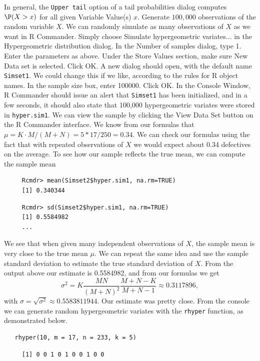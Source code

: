 \documentclass[captions=tableheading]{scrbook}
\begin{document}
\begin{example}
   In general, the \texttt{Upper tail} option of a tail probabilities dialog computes \(\P(X>x)\) for all given \textsf{Variable Value(s)} \(x\).
Generate \(100,000\) observations of the random variable \(X\).
   We can randomly simulate as many observations of \(X\) as we want in \textsf{R} Commander. Simply choose \textsf{Simulate hypergeometric variates}... in the \textsf{Hypergeometric distribution} dialog. 
   In the \textsf{Number of samples} dialog, type 1. Enter the parameters as above. Under the \textsf{Store Values} section, make sure \textsf{New Data set} is selected. Click \textsf{OK}. 
   A new dialog should open, with the default name \texttt{Simset1}.  We could change this if we like, according to the rules for \textsf{R} object names. In the sample size box, enter 100000. Click \textsf{OK}. 
   In the Console Window, \textsf{R} Commander should issue an alert that \texttt{Simset1} has been initialized, and in a few seconds, it should also state that 100,000 hypergeometric variates were stored in \texttt{hyper.sim1}. We can view the sample by clicking the \textsf{View Data Set} button on the \textsf{R} Commander interface.
   We know from our formulas that \(\mu=K\cdot M/(M+N)=5*17/250=0.34\). We can check our formulas using the fact that with repeated observations of \(X\) we would expect about 0.34 defectives on the average. To see how our sample reflects the true mean, we can compute the sample mean
\begin{verbatim}
     Rcmdr> mean(Simset2$hyper.sim1, na.rm=TRUE)
     [1] 0.340344
\end{verbatim}
   
\begin{verbatim}
     Rcmdr> sd(Simset2$hyper.sim1, na.rm=TRUE)
     [1] 0.5584982
     ...
\end{verbatim}
   We see that when given many independent observations of \(X\), the sample mean is very close to the true mean \(\mu\). We can repeat the same idea and use the sample standard deviation to estimate the true standard deviation of \(X\). From the output above our estimate is 0.5584982, and from our formulas we get
   \[
   \sigma^{2}=K\frac{MN}{(M+N)^{2}}\frac{M+N-K}{M+N-1}\approx0.3117896,
   \]
   with \(\sigma=\sqrt{\sigma^{2}}\approx0.5583811944\). Our estimate was pretty close.
   From the console we can generate random hypergeometric variates with the \texttt{rhyper} function, as demonstrated below.


\begin{verbatim}
   rhyper(10, m = 17, n = 233, k = 5)
\end{verbatim}

\begin{verbatim}
     [1] 0 0 1 0 1 0 0 1 0 0
\end{verbatim}

\end{example}
\end{document}
